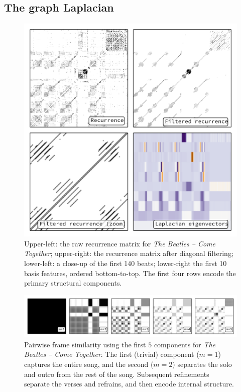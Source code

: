 \documentclass{article}
\begin{document}
\subsection{The graph Laplacian}

\cite{chung1997spectral, von2007tutorial}



\begin{figure}
\centering
\includegraphics[width=\columnwidth]{figs/recurrence}
\caption{Upper-left: the raw recurrence matrix for \emph{The Beatles -- Come Together}; upper-right: the
recurrence matrix after diagonal filtering; lower-left: a close-up of the first 140 beats; lower-right the first
10 basis features, ordered bottom-to-top.  The first four rows encode the primary structural components.\label{recurrence}}
\end{figure}

 
\begin{figure}
\centering
\includegraphics[width=\textwidth]{figs/lowrank}
\caption{Pairwise frame similarity using the first $5$ components for \emph{The Beatles -- Come Together}.  The first
(trivial) component ($m=1$) captures the entire song, and the second ($m=2$) separates the solo and outro from the
rest of the song.  Subsequent refinements separate the verses and refrains, and then encode internal structure.\label{lowrank}}
\end{figure}
\end{document}
